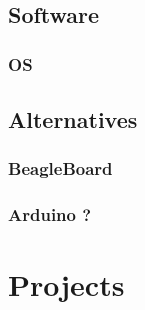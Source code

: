 \documentclass[10pt,a4paper]{article}
\begin{document}
\subsection{Software}

\subsubsection{OS}

\subsection{Alternatives}

\subsubsection{BeagleBoard}

\subsubsection{Arduino ?}

\section{Projects}
\end{document}
